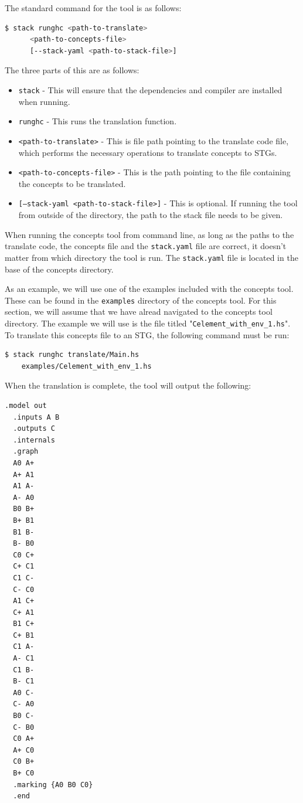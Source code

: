\documentclass[british,conference,compsoc]{IEEEtran}
\begin{document}
The standard command for the tool is as follows:

\begin{lstlisting}[language=bash]
  $ stack runghc <path-to-translate> 
      <path-to-concepts-file> 
      [--stack-yaml <path-to-stack-file>]
\end{lstlisting}

The three parts of this are as follows:
\begin{itemize}
  \item \texttt{stack} - This will ensure that the dependencies and compiler 
  	are installed when running.
  \item \texttt{runghc} - This runs the translation function.
  \item \texttt{<path-to-translate>} - This is file path pointing to the 
  	translate code file, which performs the necessary operations to translate concepts to STGs.
  \item \texttt{<path-to-concepts-file>} - This is the path pointing to the file
  	containing the concepts to be translated.
  \item \texttt{[--stack-yaml <path-to-stack-file>]} - This is optional. If 
  	running the tool from outside of the directory, the path to the stack file 
	 needs to be given.
\end{itemize}

When running the concepts tool from command line, as long as the paths to the 
translate code, the concepts file and the \texttt{stack.yaml} file are correct,
it doesn't matter from which directory the tool is run.  The \texttt{stack.yaml}
file is located in the base of the concepts directory.

As an example, we will use one of the examples included with the concepts tool.
These can be found in the \texttt{examples} directory of the concepts tool. For
this section, we will assume that we have alread navigated to the concepts tool
directory. The example we will use is the file titled 
"\texttt{Celement\_with\_env\_1.hs}". To translate this concepts file to an STG,
the following command must be run:

\begin{lstlisting}[language=bash]
  $ stack runghc translate/Main.hs 
  	examples/Celement_with_env_1.hs
\end{lstlisting}

When the translation is complete, the tool will output the following:

\begin{lstlisting}[language=bash]
  .model out
  .inputs A B
  .outputs C
  .internals
  .graph
  A0 A+
  A+ A1
  A1 A-
  A- A0
  B0 B+
  B+ B1
  B1 B-
  B- B0
  C0 C+
  C+ C1
  C1 C-
  C- C0
  A1 C+
  C+ A1
  B1 C+
  C+ B1
  C1 A-
  A- C1
  C1 B-
  B- C1
  A0 C-
  C- A0
  B0 C-
  C- B0
  C0 A+
  A+ C0
  C0 B+
  B+ C0
  .marking {A0 B0 C0}
  .end
\end{lstlisting}
\end{document}
